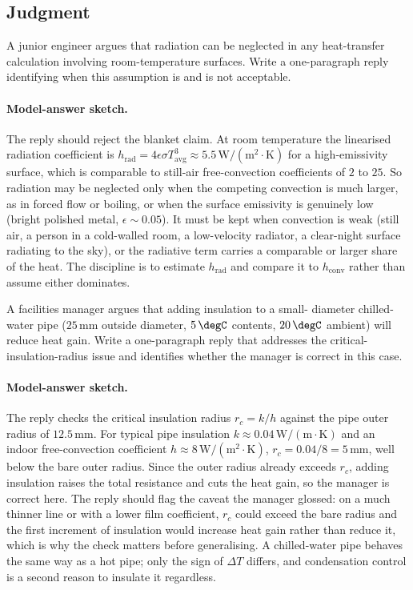 \subsection*{Judgment}

\begin{exercise}
A junior engineer argues that radiation can be neglected in any
heat-transfer calculation involving room-temperature surfaces. Write
a one-paragraph reply identifying when this assumption is and is not
acceptable.
\paragraph{Model-answer sketch.} The reply should reject the blanket
claim. At room temperature the linearised radiation coefficient is
$h_{\text{rad}} = 4\epsilon\sigma T_{\text{avg}}^3 \approx 5.5\,\text{W}/
(\text{m}^2\cdot\si{\kelvin})$ for a high-emissivity surface, which is
comparable to still-air free-convection coefficients of $2$ to $25$. So
radiation may be neglected only when the competing convection is much
larger, as in forced flow or boiling, or when the surface emissivity is
genuinely low (bright polished metal, $\epsilon \sim 0.05$). It must be
kept when convection is weak (still air, a person in a cold-walled room,
a low-velocity radiator, a clear-night surface radiating to the sky), or
the radiative term carries a comparable or larger share of the heat. The
discipline is to estimate $h_{\text{rad}}$ and compare it to $h_{\text{conv}}$
rather than assume either dominates.
\end{exercise}

\begin{exercise}
A facilities manager argues that adding insulation to a small-
diameter chilled-water pipe ($25\,\si{\milli\meter}$ outside diameter,
$5\,\degC$ contents, $20\,\degC$ ambient) will reduce heat gain. Write
a one-paragraph reply that addresses the critical-insulation-radius
issue and identifies whether the manager is correct in this case.
\paragraph{Model-answer sketch.} The reply checks the critical
insulation radius $r_c = k/h$ against the pipe outer radius of $12.5\,
\si{\milli\meter}$. For typical pipe insulation $k \approx 0.04\,\text{W}
/(\text{m}\cdot\si{\kelvin})$ and an indoor free-convection coefficient
$h \approx 8\,\text{W}/(\text{m}^2\cdot\si{\kelvin})$, $r_c = 0.04/8 =
5\,\si{\milli\meter}$, well below the bare outer radius. Since the outer
radius already exceeds $r_c$, adding insulation raises the total
resistance and cuts the heat gain, so the manager is correct here. The
reply should flag the caveat the manager glossed: on a much thinner line
or with a lower film coefficient, $r_c$ could exceed the bare radius and
the first increment of insulation would increase heat gain rather than
reduce it, which is why the check matters before generalising. A
chilled-water pipe behaves the same way as a hot pipe; only the sign of
$\Delta T$ differs, and condensation control is a second reason to
insulate it regardless.
\end{exercise}

